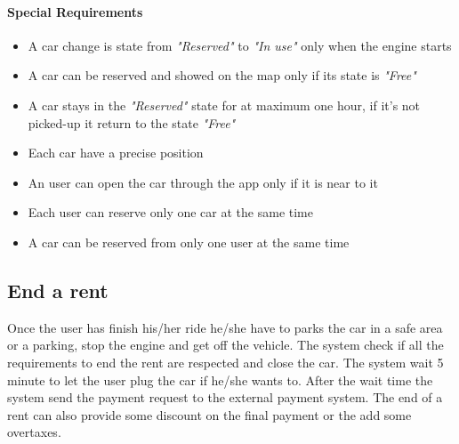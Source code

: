 \paragraph{Special Requirements}
\begin{itemize}
	\item A car change is state from \emph{"Reserved"} to \emph{"In use"} only when the engine starts
	\item A car can be reserved and showed on the map only if its state is \emph{"Free"}
	\item A car stays in the \emph{"Reserved"} state for at maximum one hour, if it's not picked-up it return to the state \emph{"Free"}
	\item Each car have a precise position
	\item An user can open the car through the app only if it is near to it
	\item Each user can reserve only one car at the same time
	\item A car can be reserved from only one user at the same time
\end{itemize}

\subsection{End a rent}
Once the user has finish his/her ride he/she have to parks the car in a safe area or a parking, stop the engine and get off the vehicle. The system check if all the requirements to end the rent are respected and close the car. The system wait 5 minute to let the user plug the car if he/she wants to. After the wait time the system send the payment request to the external payment system. The end of a rent can also provide some discount on the final payment or the add some overtaxes.
